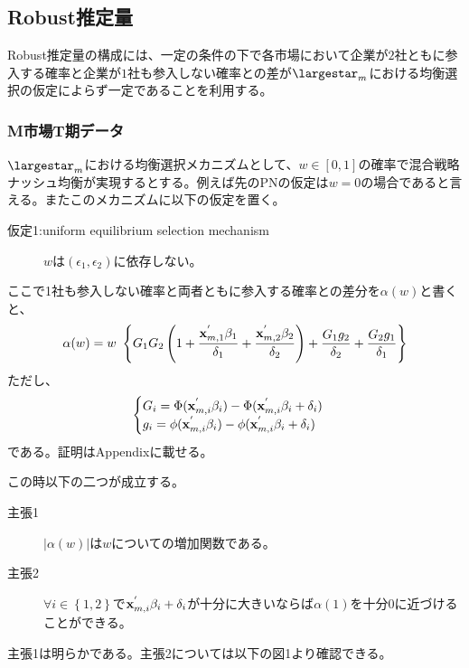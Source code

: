 \documentclass{jsarticle}
\begin{document}
\subsection{Robust推定量}
Robust推定量の構成には、一定の条件の下で各市場において企業が$2$社ともに参入する確率と企業が$1$社も参入しない確率との差が$\largestar_m$における均衡選択の仮定によらず一定であることを利用する。

\subsubsection{M市場T期データ}
$\largestar_m$における均衡選択メカニズムとして、$w \in [0,1]$の確率で混合戦略ナッシュ均衡が実現するとする。例えば先のPNの仮定は$w = 0$の場合であると言える。またこのメカニズムに以下の仮定を置く。

\begin{description}
\item[仮定1:uniform equilibrium selection mechanism] $w$は$(\epsilon_1, \epsilon_2)$に依存しない。
\end{description}

ここで1社も参入しない確率と両者ともに参入する確率との差分を$\alpha(w)$と書くと、
\begin{align*}
	\alpha(w) = w\ \left\{ G_1 G_2 \left( 1 + \frac{{\bf x}_{m, 1}^{'} \beta_1}{\delta_1} + \frac{{\bf x}_{m, 2}^{'} \beta_2}{\delta_2} \right) + \frac{G_1g_2}{\delta_2} + \frac{G_2g_1}{\delta_1} \right\}
\end{align*}
ただし、
\begin{align*}
\begin{cases}
	G_i =  \Phi({\bf x}_{m, i}^{'} \beta_i) - \Phi({\bf x}_{m, i}^{'} \beta_i  + \delta_i)\\
	g_i = \phi({\bf x}_{m, i}^{'} \beta_i) - \phi({\bf x}_{m, i}^{'} \beta_i  + \delta_i)
\end{cases}
\end{align*}
である。証明はAppendixに載せる。

この時以下の二つが成立する。
\begin{description}
	\item[主張1] $\left| \alpha(w) \right|$は$w$についての増加関数である。
	\item[主張2] $\forall i \in \left\{ 1,2\right\}$で${\bf x}_{m, i}^{'} \beta_i + \delta_i$が十分に大きいならば$\alpha(1)$を十分0に近づけることができる。
\end{description}

主張1は明らかである。主張2については以下の図1より確認できる。
\end{document}
